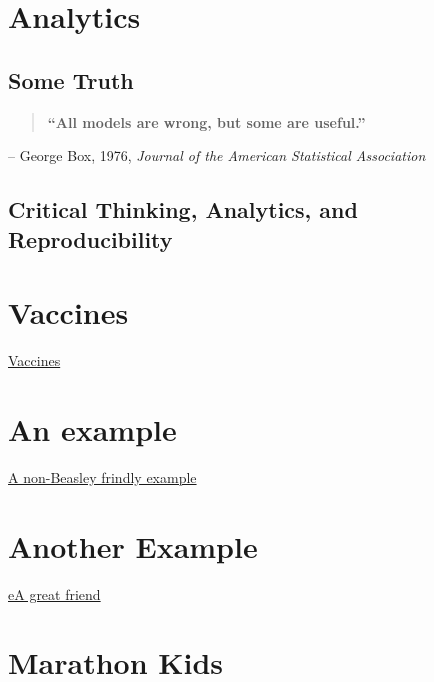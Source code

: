 \documentclass[
]{book}
\begin{document}
\hypertarget{analytics}{%
\chapter{Analytics}\label{analytics}}

\hypertarget{some-truth}{%
\section{Some Truth}\label{some-truth}}

\begin{quote}
\textbf{``All models are wrong, but some are useful.''}
\end{quote}

-- George Box, 1976, \emph{Journal of the American Statistical Association}

\hypertarget{critical-thinking-analytics-and-reproducibility}{%
\section{Critical Thinking, Analytics, and Reproducibility}\label{critical-thinking-analytics-and-reproducibility}}

\hypertarget{vaccines}{%
\chapter{Vaccines}\label{vaccines}}

\href{https://www.ncbi.nlm.nih.gov/pmc/articles/PMC5789217/}{Vaccines}

\hypertarget{an-example}{%
\chapter{An example}\label{an-example}}

\href{https://gobluehose.com/news/2023/2/1/bevy-of-newcomers-join-pc-football-program-on-national-signing-day.aspx}{A non-Beasley frindly example}

\hypertarget{another-example}{%
\chapter{Another Example}\label{another-example}}

\href{https://doctors.prismahealth.org/provider/Megan+Malone+Schellinger/992715}{eA great friend}

\hypertarget{marathon-kids}{%
\chapter{Marathon Kids}\label{marathon-kids}}
\end{document}
